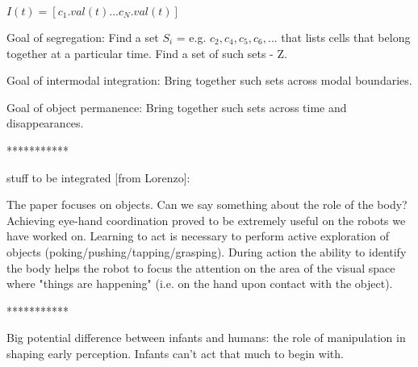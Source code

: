 $I(t) = [c_1.val(t) ... c_N.val(t)]$

Goal of segregation:
  Find a set $S_i$ = e.g. ${ c_2,c_4,c_5,c_6,... }$ that lists cells that
  belong together at a particular time.
  Find a set of such sets - Z.

Goal of intermodal integration:
  Bring together such sets across modal boundaries.

Goal of object permanence:
  Bring together such sets across time and disappearances.


***********

stuff to be integrated [from Lorenzo]:


The paper focuses on objects. Can we say something about the role of the
body? Achieving eye-hand coordination proved to be extremely useful on the
robots we have worked on. Learning to act is necessary to perform active
exploration of objects (poking/pushing/tapping/grasping). During action the
ability to identify the body helps the robot to focus the attention on the
area of the visual space where "things are happening" (i.e. on the hand upon
contact with the object).


***********

Big potential difference between infants and humans: the role
of manipulation in shaping early perception.  Infants can't
act that much to begin with.



